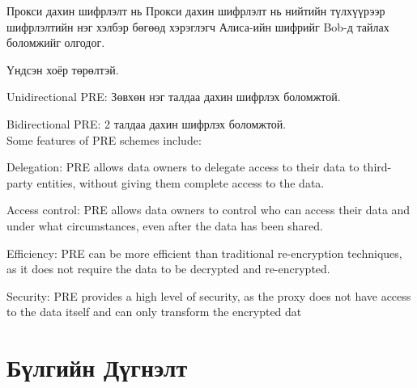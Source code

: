 Прокси дахин шифрлэлт нь 
Прокси дахин шифрлэлт нь нийтийн түлхүүрээр шифрлэлтийн нэг хэлбэр бөгөөд хэрэглэгч Алиса-ийн шифрийг Bob-д тайлах боломжийг олгодог.

Үндсэн хоёр төрөлтэй.

Unidirectional PRE: Зөвхөн нэг талдаа дахин шифрлэх боломжтой.

Bidirectional PRE: 2 талдаа дахин шифрлэх боломжтой.
\\

Some features of PRE schemes include:

Delegation: PRE allows data owners to delegate access to their data to third-party entities, without giving them complete access to the data.

Access control: PRE allows data owners to control who can access their data and under what circumstances, even after the data has been shared.

Efficiency: PRE can be more efficient than traditional re-encryption techniques, as it does not require the data to be decrypted and re-encrypted.

Security: PRE provides a high level of security, as the proxy does not have access to the data itself and can only transform the encrypted dat


\section{Бүлгийн Дүгнэлт}